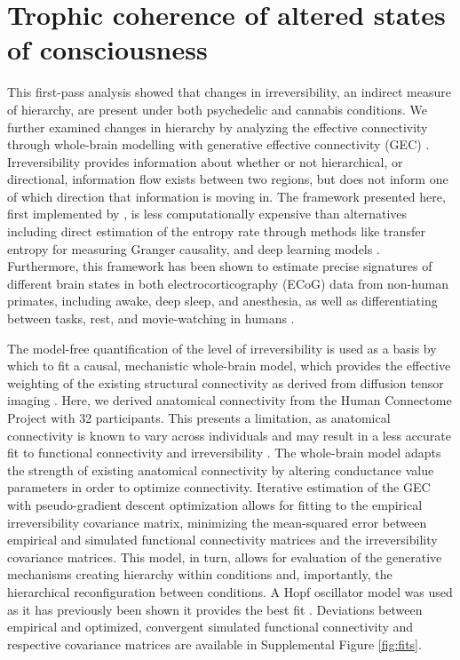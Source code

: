 \section{Trophic coherence of altered states of consciousness}
This first-pass analysis showed that changes in irreversibility, an indirect measure of hierarchy,
are present under both psychedelic and cannabis conditions. We further
examined changes in hierarchy by analyzing the effective connectivity
through whole-brain modelling with generative effective connectivity (GEC) \parencite{Kringelbach2023}. Irreversibility provides information about whether or not hierarchical, or directional, information flow exists between two regions, but does not inform one of which direction that information is moving in. The framework presented here,
first implemented by \textcite{Deco2022}, is less
computationally expensive than alternatives including direct estimation
of the entropy rate through methods like transfer entropy for measuring
Granger causality, and deep learning models \parencite{Deco2021a,Lynn2021,SanzPerl2021,Seif2021}.
Furthermore, this framework has been shown to estimate precise
signatures of different brain states in both electrocorticography (ECoG) data
from non-human primates, including awake, deep sleep, and anesthesia, as
well as differentiating between tasks, rest, and movie-watching in
humans \parencite{Deco2022,Kringelbach2023}.

The model-free quantification of the level of irreversibility is used as
a basis by which to fit a causal, mechanistic whole-brain model, which
provides the effective weighting of the existing structural connectivity
as derived from diffusion tensor imaging \parencite{Friston2003}.
Here, we derived anatomical connectivity from the Human Connectome
Project with 32 participants. This presents a limitation, as
anatomical connectivity is known to vary across individuals and may
result in a less accurate fit to functional connectivity and
irreversibility \parencite{Mueller2013}. The whole-brain model adapts the
strength of existing anatomical connectivity by altering conductance
value parameters in order to optimize connectivity. Iterative estimation of the GEC with
pseudo-gradient descent optimization allows for fitting to the
empirical irreversibility covariance matrix, minimizing the mean-squared
error between empirical and simulated functional connectivity matrices
and the irreversibility covariance matrices. This model, in turn, allows
for evaluation of the generative mechanisms creating hierarchy within
conditions and, importantly, the hierarchical reconfiguration between conditions. A Hopf oscillator model was used as it has previously been shown it
provides the best fit \parencite{Deco2017c, Deco2019a,Deco2017b, Kringelbach2023}. Deviations between empirical and optimized, convergent
simulated functional connectivity and respective covariance matrices are
available in Supplemental Figure \ref{fig:fits}.

